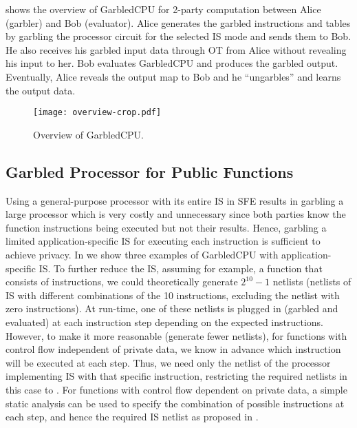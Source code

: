  shows the overview of GarbledCPU for 2-party computation between Alice (garbler) and Bob (evaluator). Alice generates the garbled instructions and tables by garbling the processor circuit for the selected IS mode and sends them to Bob. He also receives his garbled input data through OT from Alice without revealing his input to her. Bob evaluates GarbledCPU and produces the garbled output. Eventually, Alice reveals the output map to Bob and he ``ungarbles'' and learns the output data.

\begin{figure}[ht]
\centering
\texttt{[image: overview-crop.pdf]}
\caption{Overview of GarbledCPU.} \label{fig:oview}
\end{figure}

\subsection{Garbled Processor for Public Functions}
Using a general-purpose processor with its entire IS in SFE results in garbling a large processor which is very costly and unnecessary since both parties know the function instructions being executed but not their results.
Hence, garbling a limited application-specific IS for executing each instruction is sufficient to achieve privacy. In  we show three examples of GarbledCPU with application-specific IS. To further reduce the IS, assuming for example, a function that consists of  instructions, we could theoretically generate $2^{10} -1$ netlists (netlists of IS with different combinations of the 10 instructions, excluding the netlist with zero instructions). At run-time, one of these netlists is plugged in (garbled and evaluated) at each instruction step depending on the expected instructions. However, to make it more reasonable (generate fewer netlists), for functions with control flow independent of private data, we know in advance which instruction will be executed at each step. Thus, we need only the netlist of the processor implementing IS with that specific instruction, restricting the required netlists in this case to . For functions with control flow dependent on private data, a simple static analysis can be used to specify the combination of possible instructions at each step, and hence the required IS netlist as proposed in \cite{wang2015secure}.

